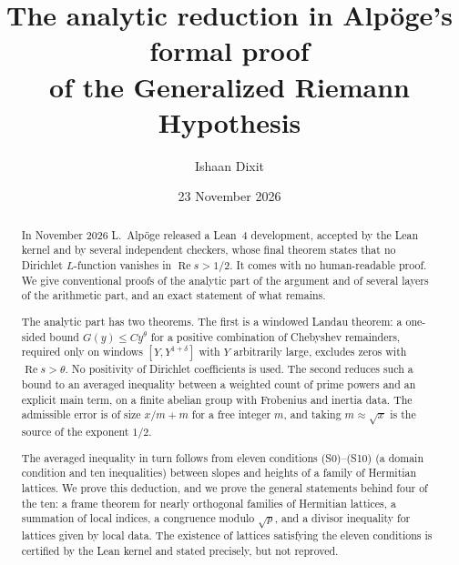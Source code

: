 \documentclass[11pt]{amsart}
\newcommand{\re}{\operatorname{Re}}
\theoremstyle{plain}
\theoremstyle{definition}
\numberwithin{equation}{section}
\begin{document}
\title[The analytic reduction in Alp\"oge's proof of GRH]{The analytic reduction in Alp\"oge's formal proof\\ of the Generalized Riemann Hypothesis}

\author{Ishaan Dixit}
\address{Arizona State University, Tempe, AZ 85281, USA}

\date{23 November 2026}


\begin{abstract}
In November 2026 L.~Alp\"oge released a Lean~4 development, accepted by the Lean kernel and by
several independent checkers, whose final theorem states that no Dirichlet $L$-function vanishes
in $\re s>1/2$. It comes with no human-readable proof. We give conventional proofs of the
analytic part of the argument and of several layers of the arithmetic part, and an exact statement
of what remains.

The analytic part has two theorems. The first is a windowed Landau theorem: a one-sided bound
$G(y)\le Cy^\theta$ for a positive combination of Chebyshev remainders, required only on windows
$[Y,Y^{1+\delta}]$ with $Y$ arbitrarily large, excludes zeros with $\re s>\theta$. No positivity of
Dirichlet coefficients is used. The second reduces such a bound to an averaged inequality between a
weighted count of prime powers and an explicit main term, on a finite abelian group with Frobenius
and inertia data. The admissible error is of size $x/m+m$ for a free integer $m$, and taking
$m\approx\sqrt x$ is the source of the exponent $1/2$.

The averaged inequality in turn follows from eleven conditions (S0)--(S10) (a domain condition
and ten inequalities) between slopes and heights of a family of Hermitian lattices. We prove this
deduction, and we prove the general statements behind four of the ten: a frame theorem for nearly
orthogonal families of Hermitian lattices, a summation of local indices, a congruence modulo
$\sqrt p$, and a divisor inequality for lattices given by local data. The existence of lattices
satisfying the eleven conditions is certified by the Lean kernel and stated precisely, but not
reproved.
\end{abstract}

\maketitle
\end{document}
